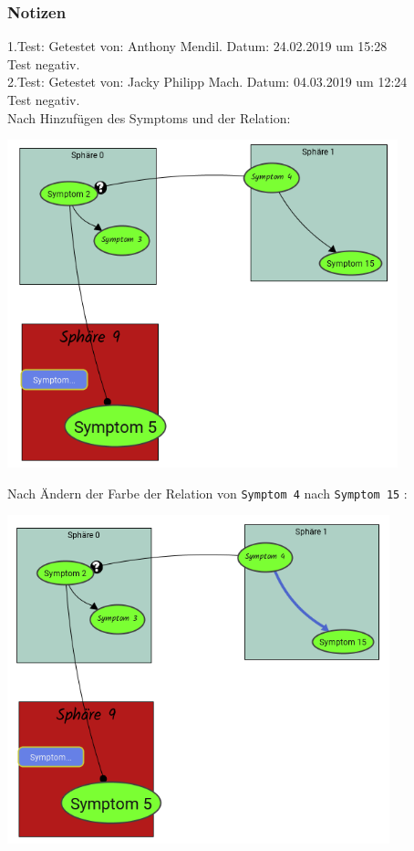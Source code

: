 \documentclass[enabledeprecatedfontcommands]{scrartcl}
\begin{document}
\subsubsection{Notizen}
1.Test: Getestet von: Anthony Mendil. Datum: 24.02.2019 um 15:28 \\
Test negativ. \\
2.Test: Getestet von: Jacky Philipp Mach. Datum: 04.03.2019 um 12:24 \\
Test negativ.\\
\newpage
Nach Hinzufügen des Symptoms und der Relation: 
\begin{center}
\includegraphics[height=9.5cm]{3_33vorher.PNG}
\end{center}
Nach Ändern der Farbe der Relation von \texttt{Symptom 4} nach \texttt{Symptom 15} :
\begin{center}
\includegraphics[height=9.5cm]{3_33.PNG}
\end{center}
\end{document}
